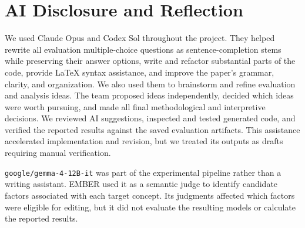 \section*{AI Disclosure and Reflection}
We used Claude Opus and Codex Sol throughout the project. They helped rewrite
all evaluation multiple-choice questions as sentence-completion stems while
preserving their answer options, write and refactor substantial
parts of the code, provide LaTeX syntax assistance, and improve the paper's
grammar, clarity, and organization. We also used them to brainstorm and refine
evaluation and analysis ideas. The team proposed ideas independently, decided
which ideas were worth pursuing, and made all final methodological and
interpretive decisions. We reviewed AI suggestions, inspected and tested
generated code, and verified the reported results against the saved evaluation
artifacts. This assistance accelerated implementation and revision, but we
treated its outputs as drafts requiring manual verification.

\texttt{google/gemma-4-12B-it} was part of the experimental pipeline rather
than a writing assistant. EMBER used it as a semantic judge to identify
candidate factors associated with each target concept. Its judgments affected
which factors were eligible for editing, but it did not evaluate the resulting
models or calculate the reported results.
